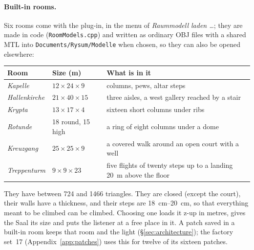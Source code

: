 \documentclass[11pt,a4paper,parskip=half,DIV=11,toc=bibliography]{scrartcl}
\newcommand{\ui}[1]{\emph{#1}}                 %
\newcommand{\fn}[1]{\mbox{\texttt{#1}}}
\begin{document}
\paragraph{Built-in rooms.} Six rooms come with the plug-in, in the menu of \ui{Raummodell laden \dots}; they are made in code
(\fn{RoomModels.cpp}) and written as ordinary OBJ files with a shared MTL into \fn{Documents/Rysum/Modelle} when chosen, so they can also be
opened elsewhere:
\begin{center}\small
\begin{tabularx}{\linewidth}{@{}llX@{}}
\toprule
Room & Size (m) & What is in it \\
\midrule
\ui{Kapelle}      & $12\times24\times9$  & columns, pews, altar steps \\
\ui{Hallenkirche} & $21\times40\times15$ & three aisles, a west gallery reached by a stair \\
\ui{Krypta}       & $13\times17\times4$  & sixteen short columns under ribs \\
\ui{Rotunde}      & 18 round, 15 high    & a ring of eight columns under a dome \\
\ui{Kreuzgang}    & $25\times25\times9$  & a covered walk around an open court with a well \\
\ui{Treppenturm}  & $9\times9\times23$   & five flights of twenty steps up to a landing \SI{20}{m} above the floor \\
\bottomrule
\end{tabularx}
\end{center}
They have between 724 and 1466 triangles. They are closed (except the court), their walls have a thickness, and their steps are
\SIrange{18}{20}{cm}, so that everything meant to be climbed can be climbed. Choosing one loads it z-up in metres, gives the Saal its size and puts
the listener at a free place in it. A patch saved in a built-in room keeps that room and the light (\S\ref{sec:architecture}); the factory set~17
(Appendix~\ref{app:patches}) uses this for twelve of its sixteen patches.
\end{document}
